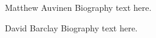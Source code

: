 \documentclass[12pt,journal,onecolumn]{IEEEtran}
\begin{document}


% 

\begin{IEEEbiography}{Matthew Auvinen}
Biography text here.
\end{IEEEbiography}
\begin{IEEEbiography}{David Barclay}
Biography text here.
\end{IEEEbiography}















\end{document}
